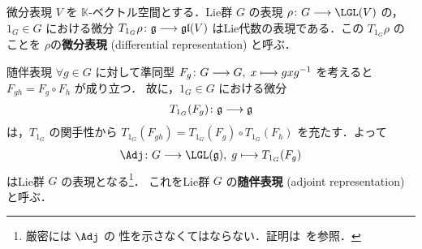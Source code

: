 \documentclass[geometry_main]{subfiles}
\begin{document}


\begin{mydef}[label=def:diff-rep]{微分表現}
    $V$ を $\mathbb{K}$-ベクトル空間とする．Lie群 $G$ の表現 $\rho \colon G \lto \LGL (V)$ の，$1_G \in G$ における微分
    $T_{1_G} \rho \colon \mathfrak{g} \longrightarrow \mathfrak{gl}(V)$ はLie代数の表現である．この $T_{1_G} \rho$ のことを $\rho$の\textbf{微分表現} (differential representation) と呼ぶ．
\end{mydef}

\begin{myexample}[label=def:Lie-adj]{随伴表現}
    $\forall g \in G$ に対して準同型 $F_g \colon G \longrightarrow G,\; x \longmapsto gxg^{-1}$ を考えると $F_{gh} = F_g \circ F_h$ が成り立つ．
    故に，$1_G \in G$ における微分
    \begin{align}
        T_{1_G} (F_g) \colon \mathfrak{g} \longrightarrow \mathfrak{g}
    \end{align}
    は，$T_{1_G}$ の関手性から $T_{1_G}(F_{gh}) = T_{1_G}(F_g) \circ T_{1_G}(F_h)$ を充たす．よって
    \begin{align}
        \Adj \colon G \lto \LGL (\mathfrak{g}),\; g \lmto T_{1_G} (F_g)
    \end{align}
    はLie群 $G$ の表現となる\footnote{厳密には $\Adj$ の \cinfty 性を示さなくてはならない．証明は~\cite[p.534, Proposition 20.24]{Lee12}を参照．}．
    これをLie群 $G$ の\textbf{随伴表現} (adjoint representation) と呼ぶ．
    

\end{myexample}
\end{document}
